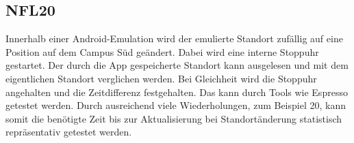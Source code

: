 \subsection*{NFL20}
Innerhalb einer Android-Emulation wird der emulierte Standort zufällig auf eine Position auf dem Campus Süd geändert.
Dabei wird eine interne Stoppuhr gestartet.
Der durch die App gespeicherte Standort kann ausgelesen und mit dem eigentlichen Standort verglichen werden.
Bei Gleichheit wird die Stoppuhr angehalten und die Zeitdifferenz festgehalten.
Das kann durch Tools wie Espresso getestet werden.
Durch ausreichend viele Wiederholungen, zum Beispiel 20, kann somit die benötigte Zeit bis zur Aktualisierung bei Standortänderung statistisch repräsentativ getestet werden.
